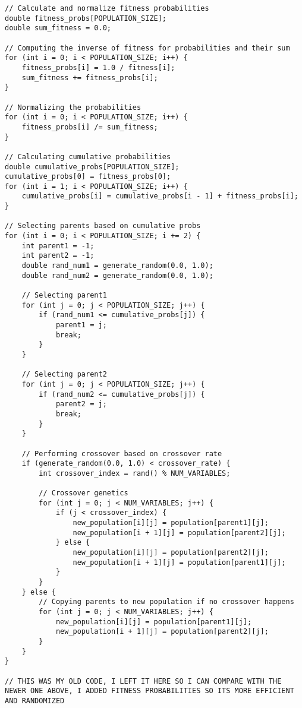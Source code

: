 \documentclass[12pt]{article}
\begin{document}
\begin{lstlisting}
// Calculate and normalize fitness probabilities
double fitness_probs[POPULATION_SIZE];
double sum_fitness = 0.0;

// Computing the inverse of fitness for probabilities and their sum
for (int i = 0; i < POPULATION_SIZE; i++) {
    fitness_probs[i] = 1.0 / fitness[i];
    sum_fitness += fitness_probs[i];
}

// Normalizing the probabilities
for (int i = 0; i < POPULATION_SIZE; i++) {
    fitness_probs[i] /= sum_fitness;
}

// Calculating cumulative probabilities
double cumulative_probs[POPULATION_SIZE];
cumulative_probs[0] = fitness_probs[0];
for (int i = 1; i < POPULATION_SIZE; i++) {
    cumulative_probs[i] = cumulative_probs[i - 1] + fitness_probs[i];
}

// Selecting parents based on cumulative probs
for (int i = 0; i < POPULATION_SIZE; i += 2) {
    int parent1 = -1;
    int parent2 = -1;
    double rand_num1 = generate_random(0.0, 1.0);
    double rand_num2 = generate_random(0.0, 1.0);

    // Selecting parent1
    for (int j = 0; j < POPULATION_SIZE; j++) {
        if (rand_num1 <= cumulative_probs[j]) {
            parent1 = j;
            break;
        }
    }

    // Selecting parent2
    for (int j = 0; j < POPULATION_SIZE; j++) {
        if (rand_num2 <= cumulative_probs[j]) {
            parent2 = j;
            break;
        }
    }

    // Performing crossover based on crossover rate
    if (generate_random(0.0, 1.0) < crossover_rate) {
        int crossover_index = rand() % NUM_VARIABLES;

        // Crossover genetics
        for (int j = 0; j < NUM_VARIABLES; j++) {
            if (j < crossover_index) {
                new_population[i][j] = population[parent1][j];
                new_population[i + 1][j] = population[parent2][j];
            } else {
                new_population[i][j] = population[parent2][j];
                new_population[i + 1][j] = population[parent1][j];
            }
        }
    } else {
        // Copying parents to new population if no crossover happens
        for (int j = 0; j < NUM_VARIABLES; j++) {
            new_population[i][j] = population[parent1][j];
            new_population[i + 1][j] = population[parent2][j];
        }
    }
}

// THIS WAS MY OLD CODE, I LEFT IT HERE SO I CAN COMPARE WITH THE NEWER ONE ABOVE, I ADDED FITNESS PROBABILITIES SO ITS MORE EFFICIENT AND RANDOMIZED


\end{lstlisting}
\end{document}
